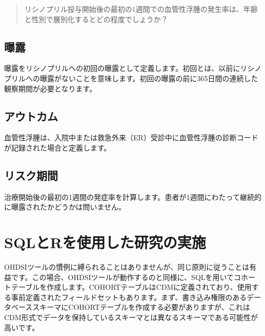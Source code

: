 \documentclass[
  11pt]{book}
\theoremstyle{definition}
\theoremstyle{definition}
\theoremstyle{definition}
\theoremstyle{definition}
\theoremstyle{remark}
\begin{document}
\begin{quote}
リシノプリル投与開始後の最初の1週間での血管性浮腫の発生率は、年齢と性別で層別化するとどの程度でしょうか？
\end{quote}

\subsection{曝露}\label{ux66ddux9732}

曝露をリシノプリルへの初回の曝露として定義します。初回とは、以前にリシノプリルへの曝露がないことを意味します。初回の曝露の前に365日間の連続した観察期間が必要となります。

\subsection{アウトカム}\label{ux30a2ux30a6ux30c8ux30abux30e0}

血管性浮腫は、入院中または救急外来（ER）受診中に血管性浮腫の診断コードが記録された場合と定義します。

\subsection{リスク期間}\label{ux30eaux30b9ux30afux671fux9593}

治療開始後の最初の1週間の発症率を計算します。患者が1週間にわたって継続的に曝露されたかどうかは問いません。

\section{SQLとRを使用した研究の実施}\label{sqlux3068rux3092ux4f7fux7528ux3057ux305fux7814ux7a76ux306eux5b9fux65bd}

OHDSIツールの慣例に縛られることはありませんが、同じ原則に従うことは有益です。この場合、OHDSIツールが動作するのと同様に、SQLを用いてコホートテーブルを作成します。COHORTテーブルはCDMに定義されており、使用する事前定義されたフィールドセットもあります。まず、書き込み権限のあるデータベーススキーマにCOHORTテーブルを作成する必要がありますが、これはCDM形式でデータを保持しているスキーマとは異なるスキーマである可能性が高いです。
\end{document}
